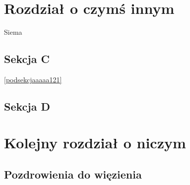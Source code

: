 \documentclass[a4paper,12pt]{book} %
\begin{document}
\chapter{Rozdział o czymś innym}
Siema \cite{doersch2021tutorial}
\section{Sekcja C}
\lipsum[1-5]
\ref{podsekcjaaaaa121}
\section{Sekcja D}
\lipsum[1-5]

\chapter{Kolejny rozdział o niczym}
\section{Pozdrowienia do więzienia}
\lipsum[1]

\listoftables{} %

\listoffigures{} %





\end{document}
